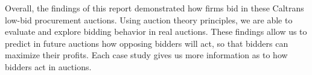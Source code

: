 Overall, the findings of this report demonstrated how firms bid in these Caltrans low-bid procurement auctions.
Using auction theory principles, we are able to evaluate and explore bidding behavior in real auctions.
These findings allow us to predict in future auctions how opposing bidders will act, so that bidders can maximize their profits.
Each case study gives us more information as to how bidders act in auctions.


%
%
